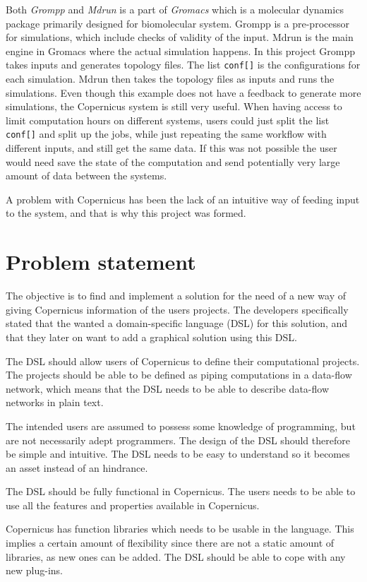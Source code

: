 Both \emph{Grompp} and \emph{Mdrun} is a part of \emph{Gromacs} which
is a molecular dynamics package primarily designed for biomolecular
system. Grompp is a pre-processor for simulations, which include
checks of validity of the input. Mdrun is the main engine in Gromacs
where the actual simulation happens. In this project Grompp takes
inputs and generates topology files. The list \verb#conf[]# is the
configurations for each simulation. Mdrun then takes the topology
files as inputs and runs the simulations. Even though this example
does not have a feedback to generate more simulations, the Copernicus
system is still very useful. When having access to limit computation
hours on different systems, users could just split the list
\verb#conf[]# and split up the jobs, while just repeating the same
workflow with different inputs, and still get the same data. If this
was not possible the user would need save the state of the computation
and send potentially very large amount of data between the systems.


A problem with Copernicus has been the lack of an intuitive way of
feeding input to the system, and that is why this project was formed.


\section{Problem statement}
The objective is to find and implement a solution for the need of a
new way of giving Copernicus information of the users projects. The
developers specifically stated that the wanted a domain-specific
language (DSL) for this solution, and that they later on want to add a
graphical solution using this DSL.

The DSL should allow users of Copernicus to define their computational
projects. The projects should be able to be defined as piping
computations in a data-flow network, which means that the DSL needs to
be able to describe data-flow networks in plain text.

The intended users are assumed to possess some knowledge of
programming, but are not necessarily adept programmers. The design of
the DSL should therefore be simple and intuitive. The DSL needs to be
easy to understand so it becomes an asset instead of an hindrance.

The DSL should be fully functional in Copernicus. The users needs to
be able to use all the features and properties available in
Copernicus.

Copernicus has function libraries which needs to be usable in the
language. This implies a certain amount of flexibility since there are
not a static amount of libraries, as new ones can be added. The DSL
should be able to cope with any new plug-ins.


